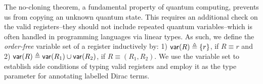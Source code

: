The no-cloning theorem, a fundamental property of quantum computing, prevents us from copying an unknown quantum state. This requires an additional check on the valid registers--they should not include repeated quantum variables--which is often handled in programming languages via linear types. As such, we define the \emph{order-free} variable set of a register inductively by: 1) $\mathsf{var}(R) \triangleq \{r\}$, if $R\equiv r$ and 2) $\mathsf{var}(R) \triangleq \mathsf{var}(R_1) \cup\mathsf{var}(R_2)$, if $R\equiv (R_1,R_2)$.
We use the variable set to establish side conditions of typing valid registers and employ it as the type parameter for annotating labelled Dirac terms.



